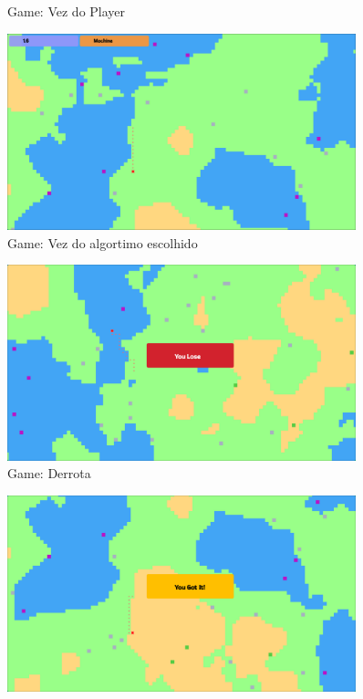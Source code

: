 \documentclass[
	12pt,				%
	oneside,			%
	a4paper,			%
	english,			%
	brazil,				%
	]{abntex2}
\begin{document}
{\begin{figure}[H]
\caption{Game: Vez do Player}
\label{imagem 5}
\end{figure}
\begin{figure}[H]
\centering
\includegraphics[width=0.9\textwidth]{imgs/machine.png}
\caption{Game: Vez do algortimo escolhido}
\label{imagem 5}
\end{figure}
\begin{figure}[H]
\centering
\includegraphics[width=0.9\textwidth]{imgs/derrota.png}
\caption{Game: Derrota}
\label{imagem 5}
\end{figure}
\begin{figure}[H]
\centering
\includegraphics[width=0.9\textwidth]{imgs/empate.png}

\end{figure}}
\end{document}
